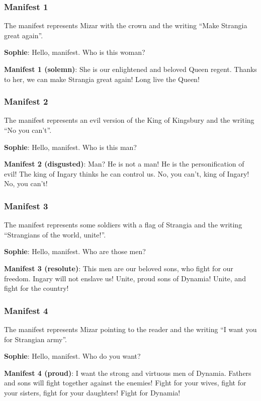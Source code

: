 \subsubsection*{Manifest 1}
The manifest represents Mizar with the crown and the writing \enquote{Make Strangia great again}.

\textbf{Sophie}: Hello, manifest. Who is this woman?

\textbf{Manifest 1 (solemn)}: She is our enlightened and beloved Queen regent. Thanks to her, we can make Strangia great again! Long live the Queen!

\subsubsection*{Manifest 2}
The manifest represents an evil version of the King of Kingsbury and the writing \enquote{No you can't}.

\textbf{Sophie}: Hello, manifest. Who is this man?

\textbf{Manifest 2 (disgusted)}: Man? He is not a man! He is the personification of evil! The king of Ingary thinks he can control us. No, you can't, king of Ingary! No, you can't!

\subsubsection*{Manifest 3}
The manifest represents some soldiers with a flag of Strangia and the writing \enquote{Strangians of the world, unite!}.

\textbf{Sophie}: Hello, manifest. Who are those men?

\textbf{Manifest 3 (resolute)}: This men are our beloved sons, who fight for our freedom. Ingary will not enslave us! Unite, proud sons of Dynamia! Unite, and fight for the country!

\subsubsection*{Manifest 4}
The manifest represents Mizar pointing to the reader and the writing \enquote{I want you for Strangian army}.

\textbf{Sophie}: Hello, manifest. Who do you want?

\textbf{Manifest 4 (proud)}: I want the strong and virtuous men of Dynamia. Fathers and sons will fight together against the enemies! Fight for your wives, fight for your sisters, fight for your daughters! Fight for Dynamia!

